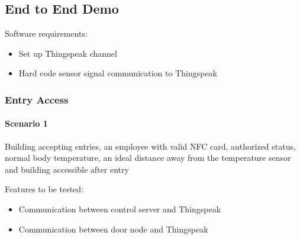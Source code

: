 \subsection{End to End Demo}

\noindent
Software requirements:
\begin{itemize}
    \item Set up Thingspeak channel 
    \item Hard code sensor signal communication to Thingspeak 
\end{itemize}

\subsubsection*{Entry Access}

\paragraph{Scenario 1}
Building accepting entries, an employee with valid NFC card, authorized status,
normal body temperature, an ideal distance away from the temperature sensor and
building accessible after entry

\noindent
Features to be tested:
\begin{itemize}
    \item Communication between control server and Thingspeak
    \item Communication between door node and Thingspeak
\end{itemize}

